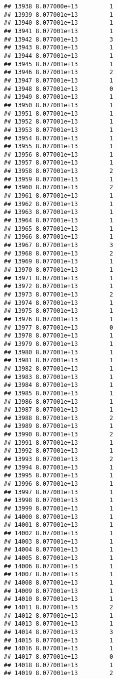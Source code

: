 \documentclass[
]{article}
\begin{document}
\begin{verbatim}
## 13938 8.077000e+13         1
## 13939 8.077001e+13         1
## 13940 8.077001e+13         1
## 13941 8.077001e+13         1
## 13942 8.077001e+13         3
## 13943 8.077001e+13         1
## 13944 8.077001e+13         1
## 13945 8.077001e+13         1
## 13946 8.077001e+13         2
## 13947 8.077001e+13         1
## 13948 8.077001e+13         0
## 13949 8.077001e+13         1
## 13950 8.077001e+13         1
## 13951 8.077001e+13         1
## 13952 8.077001e+13         1
## 13953 8.077001e+13         1
## 13954 8.077001e+13         1
## 13955 8.077001e+13         1
## 13956 8.077001e+13         1
## 13957 8.077001e+13         1
## 13958 8.077001e+13         2
## 13959 8.077001e+13         1
## 13960 8.077001e+13         2
## 13961 8.077001e+13         1
## 13962 8.077001e+13         1
## 13963 8.077001e+13         1
## 13964 8.077001e+13         1
## 13965 8.077001e+13         1
## 13966 8.077001e+13         1
## 13967 8.077001e+13         3
## 13968 8.077001e+13         2
## 13969 8.077001e+13         1
## 13970 8.077001e+13         1
## 13971 8.077001e+13         1
## 13972 8.077001e+13         1
## 13973 8.077001e+13         2
## 13974 8.077001e+13         1
## 13975 8.077001e+13         1
## 13976 8.077001e+13         1
## 13977 8.077001e+13         0
## 13978 8.077001e+13         1
## 13979 8.077001e+13         1
## 13980 8.077001e+13         1
## 13981 8.077001e+13         1
## 13982 8.077001e+13         1
## 13983 8.077001e+13         1
## 13984 8.077001e+13         1
## 13985 8.077001e+13         1
## 13986 8.077001e+13         1
## 13987 8.077001e+13         1
## 13988 8.077001e+13         2
## 13989 8.077001e+13         1
## 13990 8.077001e+13         2
## 13991 8.077001e+13         1
## 13992 8.077001e+13         1
## 13993 8.077001e+13         2
## 13994 8.077001e+13         1
## 13995 8.077001e+13         1
## 13996 8.077001e+13         1
## 13997 8.077001e+13         1
## 13998 8.077001e+13         1
## 13999 8.077001e+13         1
## 14000 8.077001e+13         1
## 14001 8.077001e+13         1
## 14002 8.077001e+13         1
## 14003 8.077001e+13         1
## 14004 8.077001e+13         1
## 14005 8.077001e+13         1
## 14006 8.077001e+13         1
## 14007 8.077001e+13         1
## 14008 8.077001e+13         1
## 14009 8.077001e+13         1
## 14010 8.077001e+13         1
## 14011 8.077001e+13         2
## 14012 8.077001e+13         1
## 14013 8.077001e+13         1
## 14014 8.077001e+13         3
## 14015 8.077001e+13         1
## 14016 8.077001e+13         1
## 14017 8.077001e+13         0
## 14018 8.077001e+13         1
## 14019 8.077001e+13         2

\end{verbatim}
\end{document}
